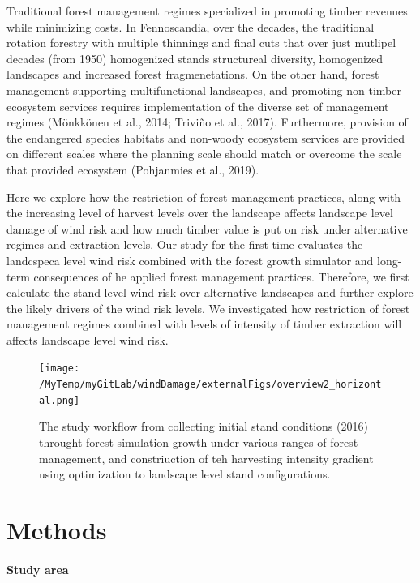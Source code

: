 \documentclass[]{elsarticle} %
\begin{document}
Traditional forest management regimes specialized in promoting timber
revenues while minimizing costs. In Fennoscandia, over the decades, the
traditional rotation forestry with multiple thinnings and final cuts
that over just mutlipel decades (from 1950) homogenized stands
structureal diversity, homogenized landscapes and increased forest
fragmenetations. On the other hand, forest management supporting
multifunctional landscapes, and promoting non-timber ecosystem services
requires implementation of the diverse set of management regimes
(Mönkkönen et al., 2014; Triviño et al., 2017). Furthermore, provision
of the endangered species habitats and non-woody ecosystem services are
provided on different scales where the planning scale should match or
overcome the scale that provided ecosystem (Pohjanmies et al., 2019).

Here we explore how the restriction of forest management practices,
along with the increasing level of harvest levels over the landscape
affects landscape level damage of wind risk and how much timber value is
put on risk under alternative regimes and extraction levels. Our study
for the first time evaluates the landcspeca level wind risk combined
with the forest growth simulator and long-term consequences of he
applied forest management practices. Therefore, we first calculate the
stand level wind risk over alternative landscapes and further explore
the likely drivers of the wind risk levels. We investigated how
restriction of forest management regimes combined with levels of
intensity of timber extraction will affects landscape level wind risk.

\begin{figure}
\centering
\texttt{[image: /MyTemp/myGitLab/windDamage/externalFigs/overview2\_horizontal.png]}
\caption{The study workflow from collecting initial stand conditions
(2016) throught forest simulation growth under various ranges of forest
management, and constriuction of teh harvesting intensity gradient using
optimization to landscape level stand configurations.\label{workflow}}
\end{figure}

\section{Methods}\label{methods}

\paragraph{Study area}\label{study-area}
\end{document}
